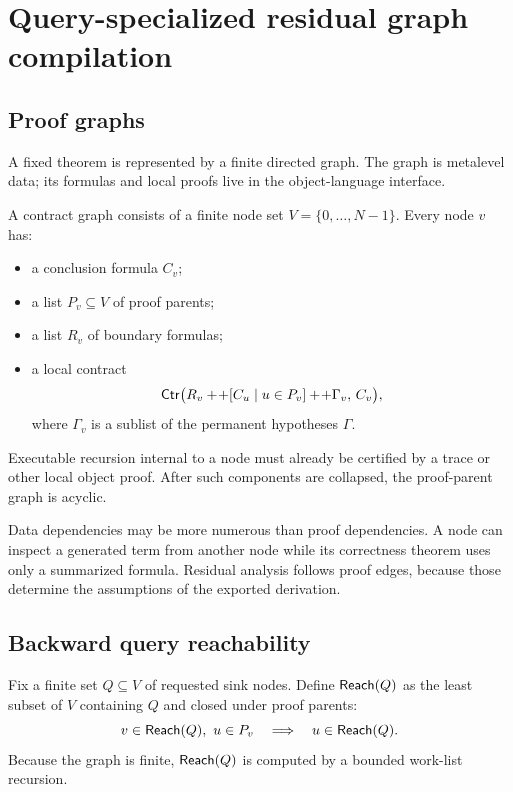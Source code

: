 \section{Query-specialized residual graph compilation}\label{sec:query-compiler}

\subsection{Proof graphs}

A fixed theorem is represented by a finite directed graph.  The graph is metalevel data; its formulas and local proofs live in the object-language interface.

\begin{definition}
A contract graph consists of a finite node set \(V=\{0,\ldots,N-1\}\).  Every node \(v\) has:
\begin{itemize}
  \item a conclusion formula \(C_v\);
  \item a list \(P_v\subseteq V\) of proof parents;
  \item a list \(R_v\) of boundary formulas;
  \item a local contract
  \[
      \mathsf{Ctr}\bigl(R_v+\!+[C_u\mid u\in P_v]+\!+\Gamma_v,\,C_v\bigr),
  \]
  where \(\Gamma_v\) is a sublist of the permanent hypotheses \(\Gamma\).
\end{itemize}
Executable recursion internal to a node must already be certified by a trace or other local object proof.  After such components are collapsed, the proof-parent graph is acyclic.
\end{definition}

Data dependencies may be more numerous than proof dependencies.  A node can inspect a generated term from another node while its correctness theorem uses only a summarized formula.  Residual analysis follows proof edges, because those determine the assumptions of the exported derivation.

\subsection{Backward query reachability}

Fix a finite set \(Q\subseteq V\) of requested sink nodes.  Define \(\mathsf{Reach}(Q)\) as the least subset of \(V\) containing \(Q\) and closed under proof parents:
\[
 v\in\mathsf{Reach}(Q),\ u\in P_v\quad\Longrightarrow\quad u\in\mathsf{Reach}(Q).
\]
Because the graph is finite, \(\mathsf{Reach}(Q)\) is computed by a bounded work-list recursion.

